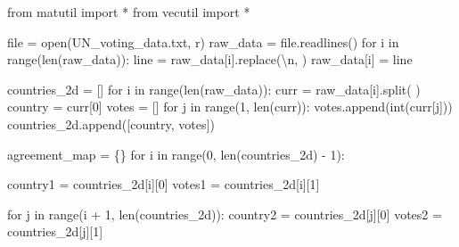 \documentclass[
  letterpaper,
  DIV=11,
  numbers=noendperiod]{scrartcl}
\newenvironment{Shaded}{\begin{snugshade}}{\end{snugshade}}
\newcommand{\BuiltInTok}[1]{\textcolor[rgb]{0.00,0.23,0.31}{#1}}
\newcommand{\CharTok}[1]{\textcolor[rgb]{0.13,0.47,0.30}{#1}}
\newcommand{\ControlFlowTok}[1]{\textcolor[rgb]{0.00,0.23,0.31}{#1}}
\newcommand{\DecValTok}[1]{\textcolor[rgb]{0.68,0.00,0.00}{#1}}
\newcommand{\ImportTok}[1]{\textcolor[rgb]{0.00,0.46,0.62}{#1}}
\newcommand{\KeywordTok}[1]{\textcolor[rgb]{0.00,0.23,0.31}{#1}}
\newcommand{\NormalTok}[1]{\textcolor[rgb]{0.00,0.23,0.31}{#1}}
\newcommand{\OperatorTok}[1]{\textcolor[rgb]{0.37,0.37,0.37}{#1}}
\newcommand{\StringTok}[1]{\textcolor[rgb]{0.13,0.47,0.30}{#1}}
\begin{document}
\begin{Shaded}
\begin{Highlighting}[numbers=left,,]
  \ImportTok{from}\NormalTok{ matutil }\ImportTok{import} \OperatorTok{*}
  \ImportTok{from}\NormalTok{ vecutil }\ImportTok{import} \OperatorTok{*}

\BuiltInTok{file} \OperatorTok{=} \BuiltInTok{open}\NormalTok{(}\StringTok{\textquotesingle{}UN\_voting\_data.txt\textquotesingle{}}\NormalTok{, }\StringTok{\textquotesingle{}r\textquotesingle{}}\NormalTok{)}
\NormalTok{raw\_data }\OperatorTok{=} \BuiltInTok{file}\NormalTok{.readlines()}
\ControlFlowTok{for}\NormalTok{ i }\KeywordTok{in} \BuiltInTok{range}\NormalTok{(}\BuiltInTok{len}\NormalTok{(raw\_data)):}
\NormalTok{    line }\OperatorTok{=}\NormalTok{ raw\_data[i].replace(}\StringTok{\textquotesingle{}}\CharTok{\textbackslash{}n}\StringTok{\textquotesingle{}}\NormalTok{, }\StringTok{\textquotesingle{}\textquotesingle{}}\NormalTok{)}
\NormalTok{    raw\_data[i] }\OperatorTok{=}\NormalTok{ line}

\NormalTok{countries\_2d }\OperatorTok{=}\NormalTok{ []}
\ControlFlowTok{for}\NormalTok{ i }\KeywordTok{in} \BuiltInTok{range}\NormalTok{(}\BuiltInTok{len}\NormalTok{(raw\_data)):}
\NormalTok{    curr }\OperatorTok{=}\NormalTok{ raw\_data[i].split(}\StringTok{\textquotesingle{} \textquotesingle{}}\NormalTok{)}
\NormalTok{    country }\OperatorTok{=}\NormalTok{ curr[}\DecValTok{0}\NormalTok{]}
\NormalTok{    votes }\OperatorTok{=}\NormalTok{ []}
    \ControlFlowTok{for}\NormalTok{ j }\KeywordTok{in} \BuiltInTok{range}\NormalTok{(}\DecValTok{1}\NormalTok{, }\BuiltInTok{len}\NormalTok{(curr)):}
\NormalTok{        votes.append(}\BuiltInTok{int}\NormalTok{(curr[j]))}
\NormalTok{    countries\_2d.append([country, votes])}

\NormalTok{agreement\_map }\OperatorTok{=}\NormalTok{ \{\}}
\ControlFlowTok{for}\NormalTok{ i }\KeywordTok{in} \BuiltInTok{range}\NormalTok{(}\DecValTok{0}\NormalTok{, }\BuiltInTok{len}\NormalTok{(countries\_2d) }\OperatorTok{{-}} \DecValTok{1}\NormalTok{):}

\NormalTok{    country1 }\OperatorTok{=}\NormalTok{ countries\_2d[i][}\DecValTok{0}\NormalTok{]}
\NormalTok{    votes1 }\OperatorTok{=}\NormalTok{ countries\_2d[i][}\DecValTok{1}\NormalTok{]}

    \ControlFlowTok{for}\NormalTok{ j }\KeywordTok{in} \BuiltInTok{range}\NormalTok{(i }\OperatorTok{+} \DecValTok{1}\NormalTok{, }\BuiltInTok{len}\NormalTok{(countries\_2d)):}
\NormalTok{        country2 }\OperatorTok{=}\NormalTok{ countries\_2d[j][}\DecValTok{0}\NormalTok{]}
\NormalTok{        votes2 }\OperatorTok{=}\NormalTok{ countries\_2d[j][}\DecValTok{1}\NormalTok{]}


\end{Highlighting}
\end{Shaded}
\end{document}
